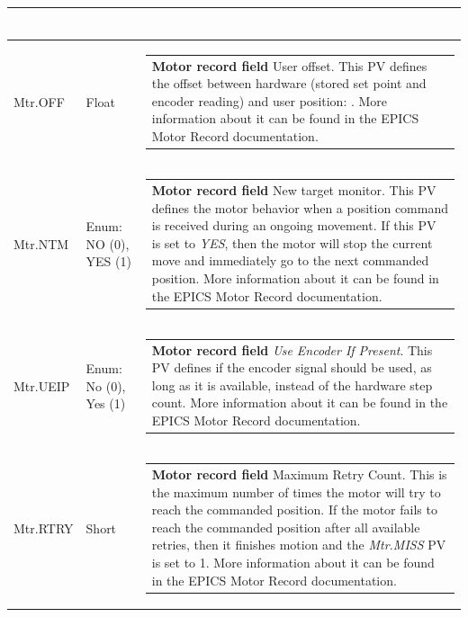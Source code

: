 \documentclass[openany]{article}
\begin{document}
\begin{longtable}{| m{4.5cm} m{2.5cm}  m{8.5cm} |}
\begin{tabular}{@{}m{6cm}@{}}
            \end{tabular} \hypertarget{pv:mtr-off}{}\\ \hline
        Mtr.OFF & Float & \begin{tabular}{@{}m{6cm}@{}}
                \textbf{\color{ForestGreen} Motor record field} User offset. This PV defines the offset between hardware (stored set point and encoder reading) and user position: $userPos = Mtr.DIR * HwdPos + Offset$. More information about it can be found in the EPICS Motor Record documentation.
            \end{tabular} \hypertarget{pv:mtr-ntm}{}\\ \hline
        Mtr.NTM & Enum: NO (0), YES (1) & \begin{tabular}{@{}m{6cm}@{}}
                \textbf{\color{ForestGreen} Motor record field} New target monitor. This PV defines the motor behavior when a position command is received during an ongoing movement. If this PV is set to \emph{YES}, then the motor will stop the current move and immediately go to the next commanded position. More information about it can be found in the EPICS Motor Record documentation.
            \end{tabular} \hypertarget{pv:mtr-ueip}{}\\ \hline
        Mtr.UEIP & Enum: No (0), Yes (1) & \begin{tabular}{@{}m{6cm}@{}}
                \textbf{\color{ForestGreen} Motor record field} \emph{Use Encoder If Present}. This PV defines if the encoder signal should be used, as long as it is available, instead of the hardware step count. More information about it can be found in the EPICS Motor Record documentation.
            \end{tabular} \hypertarget{pv:mtr-rtry}{}\\ \hline
        Mtr.RTRY & Short & \begin{tabular}{@{}m{6cm}@{}}
                \textbf{\color{ForestGreen} Motor record field} Maximum Retry Count. This is the maximum number of times the motor will try to reach the commanded position. If the motor fails to reach the commanded position after all available retries, then it finishes motion and the \emph{Mtr.MISS} PV is set to 1. More information about it can be found in the EPICS Motor Record documentation.
            \end{tabular} \hypertarget{pv:mtr-rdbd}{}\\ \hline

\end{longtable}
\end{document}
